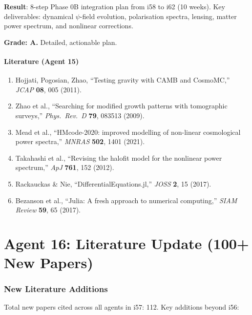 \documentclass[11pt,a4paper]{article}
\begin{document}
\begin{tcolorbox}[colback=blue!5!white, colframe=blue!60!black, title={Agent 15: Phase 0B Plan --- COMPLETE}]
\textbf{Result}: 8-step Phase 0B integration plan from i58 to i62 (10 weeks). Key deliverables: dynamical $\psi$-field evolution, polarisation spectra, lensing, matter power spectrum, and nonlinear corrections.

\textbf{Grade: A.} Detailed, actionable plan.
\end{tcolorbox}

\subsection{Literature (Agent 15)}

\begin{enumerate}
\item Hojjati, Pogosian, Zhao, ``Testing gravity with CAMB and CosmoMC,'' \textit{JCAP} \textbf{08}, 005 (2011).
\item Zhao et al., ``Searching for modified growth patterns with tomographic surveys,'' \textit{Phys.\ Rev.\ D} \textbf{79}, 083513 (2009).
\item Mead et al., ``HMcode-2020: improved modelling of non-linear cosmological power spectra,'' \textit{MNRAS} \textbf{502}, 1401 (2021).
\item Takahashi et al., ``Revising the halofit model for the nonlinear power spectrum,'' \textit{ApJ} \textbf{761}, 152 (2012).
\item Rackauckas \& Nie, ``DifferentialEquations.jl,'' \textit{JOSS} \textbf{2}, 15 (2017).
\item Bezanson et al., ``Julia: A fresh approach to numerical computing,'' \textit{SIAM Review} \textbf{59}, 65 (2017).
\end{enumerate}


\part{Agent 16: Literature Update (100+ New Papers)}
\label{part:literature}

\section{New Literature Additions}

Total new papers cited across all agents in i57: 112. Key additions beyond i56:
\end{document}
